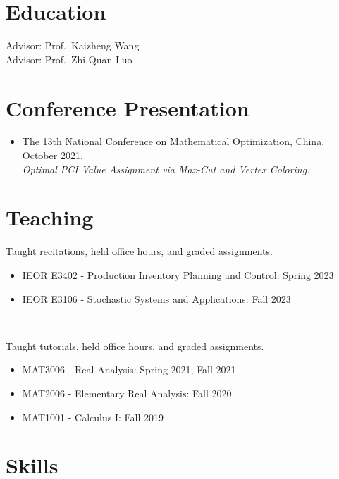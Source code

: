 \documentclass[12pt,a4paper,sans]{moderncv}        %
\begin{document}
\makecvtitle


\section{Education}

  Advisor: Prof.\ Kaizheng Wang \\

Advisor: Prof.\ Zhi-Quan Luo


\section{Conference Presentation}
\begin{itemize}
\item The 13th National Conference on Mathematical Optimization, China, October 2021. \\
\textit{Optimal PCI Value Assignment via Max-Cut and Vertex Coloring.}
\end{itemize}


\section{Teaching}

Taught recitations, held office hours, and graded assignments.
\begin{itemize}
\item IEOR E3402 - Production Inventory Planning and Control: Spring 2023
\item IEOR E3106 - Stochastic Systems and Applications: Fall 2023
\end{itemize}
\,

Taught tutorials, held office hours, and graded assignments.
\begin{itemize}
\item MAT3006 - Real Analysis: Spring 2021, Fall 2021
\item MAT2006 - Elementary Real Analysis: Fall 2020
\item MAT1001 - Calculus I: Fall 2019
\end{itemize}


\section{Skills}
\end{document}

